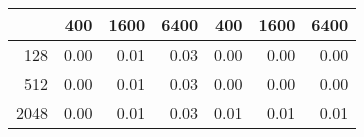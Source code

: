 \begin{table}[ht]
\centering
\begin{tabular}{rrrrrrr}
  \hline
 & 400 & 1600 & 6400 & 400 & 1600 & 6400 \\ 
  \hline
128 & 0.00 & 0.01 & 0.03 & 0.00 & 0.00 & 0.00 \\ 
  512 & 0.00 & 0.01 & 0.03 & 0.00 & 0.00 & 0.00 \\ 
  2048 & 0.00 & 0.01 & 0.03 & 0.01 & 0.01 & 0.01 \\ 
   \hline
\end{tabular}
\end{table}
